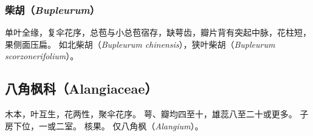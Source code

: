 \documentclass[11pt]{article}
\begin{document}
\begin{sloppypar}
\subsubsection{柴胡（\textit{Bupleurum}）}
单叶全缘，复伞花序，总苞与小总苞宿存，缺萼齿，瓣片背有突起中脉，花柱短，果侧面压扁。
如北柴胡（\textit{Bupleurum chinensis}），狭叶柴胡（\textit{Bupleurum scorzonerifolium}）。

\subsection{八角枫科（Alangiaceae）}
木本，叶互生，花两性，聚伞花序。
萼、瓣均四至十，雄蕊八至二十或更多。
子房下位，一或二室。
核果。
仅八角枫（\textit{Alangium}）。




\end{sloppypar}
\end{document}
